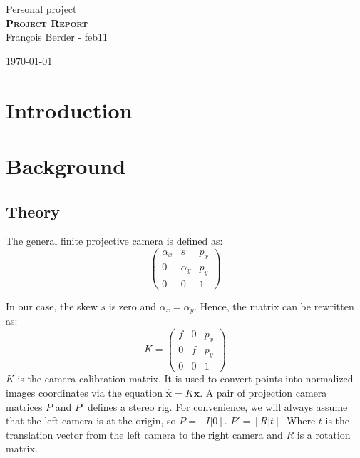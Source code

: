 \documentclass[12pt]{article}
\begin{document}
\LinesNumbered
\begin{titlepage}
	
	\begin{center}
	   
	\vspace*{3cm}
	
	{\Large Personal project}\\[1cm]
	{ \huge \bfseries \textsc{Project Report}}\\[0.2cm]
	
	\vspace*{1cm}
	  	Fran\c{c}ois Berder - feb11\\
     \vfill

    {\large \today}
	\end{center}
\end{titlepage}

\section{Introduction}
\section{Background}
\subsection{Theory}

The general finite projective camera is defined as:
\[
\left (
\begin{matrix}
	\alpha_x & s & p_x \\
	0 & \alpha_y & p_y \\
	0 & 0 & 1
\end{matrix}
\right )
\]

In our case, the skew $s$ is zero and $\alpha_x = \alpha_y$. Hence, the matrix can be rewritten as: 
\[
K = 
\left (
\begin{matrix}
	f & 0 & p_x \\
	0 & f & p_y \\
	0 & 0 & 1
\end{matrix}
\right )
\]
$K$ is the camera calibration matrix. It is used to convert points into normalized images coordinates via the equation $\hat{\mathbf{x}} = K\mathbf{x}$.
A pair of projection camera matrices $P$ and $P'$ defines a stereo rig. For convenience, we will always assume that the left camera is at the origin, so $P = [I|0]$. $P'=[R|t]$. Where $t$ is the translation vector from the left camera to the right camera and $R$ is a rotation matrix.
\end{document}
